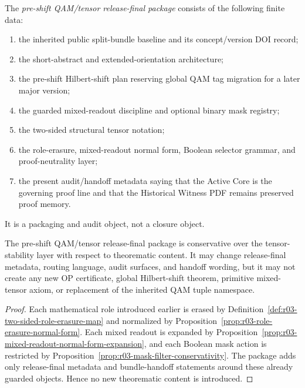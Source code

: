 \begin{definition}
\label{def:r04-pre-shift-qam-tensor-release-final-package}
The \emph{pre-shift QAM/tensor release-final package} consists of the following finite data:
\begin{enumerate}[label=(\roman*)]
 \item the inherited  public split-bundle baseline and its concept/version DOI record;
 \item the  short-abstract and extended-orientation architecture;
 \item the pre-shift Hilbert-shift plan reserving global QAM tag migration for a later major version;
 \item the guarded mixed-readout discipline and optional binary mask registry;
 \item the two-sided structural tensor notation;
 \item the role-erasure, mixed-readout normal form, Boolean selector grammar, and proof-neutrality layer;
 \item the present audit/handoff metadata saying that the Active Core is the governing proof line and that the Historical Witness PDF remains preserved proof memory.
\end{enumerate}
It is a packaging and audit object, not a closure object.
\end{definition}

\begin{proposition}
\label{prop:r04-release-final-conservativity}
The pre-shift QAM/tensor release-final package is conservative over the tensor-stability layer with respect to theorematic content. It may change release-final metadata, routing language, audit surfaces, and handoff wording, but it may not create any new OP certificate, global Hilbert-shift theorem, primitive mixed-tensor axiom, or replacement of the inherited QAM tuple namespace.
\end{proposition}

\begin{proof}
Each mathematical role introduced earlier is erased by Definition~\ref{def:r03-two-sided-role-erasure-map} and normalized by Proposition~\ref{prop:r03-role-erasure-normal-form}. Each mixed readout is expanded by Proposition~\ref{prop:r03-mixed-readout-normal-form-expansion}, and each Boolean mask action is restricted by Proposition~\ref{prop:r03-mask-filter-conservativity}. The package adds only release-final metadata and bundle-handoff statements around these already guarded objects. Hence no new theorematic content is introduced.
\end{proof}

